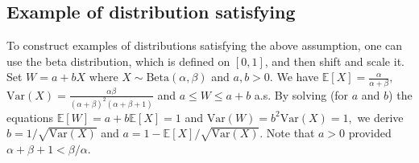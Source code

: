 \subsection{Example of distribution satisfying }
\label{sec:example_distribution}
To construct examples of distributions satisfying the above assumption, one can use the beta distribution, which is defined on \([0, 1]\), and then shift and scale it. Set \( W = a + bX \)  where \( X \sim \text{Beta}(\alpha, \beta) \) and \(a,b>0.\) We have \( \mathbb{E}[X] = \frac{\alpha}{\alpha + \beta}, \)  \( \text{Var}(X) = \frac{\alpha \beta}{(\alpha + \beta)^2 (\alpha + \beta + 1)} \) and \(a\leq W\leq a+b \) a.s.  By solving (for \( a \) and \( b \)) the equations \( \mathbb{E}[W] = a + b\mathbb{E}[X] = 1 \) and \( \text{Var}(W) = b^2\text{Var}(X) = 1, \) we derive \(b=1/\sqrt{\text{Var}(X)}\) and \(a=1-\mathbb{E}[X]/\sqrt{\text{Var}(X)}.\) Note that $a>0$ provided $\alpha+\beta+1<\beta/\alpha$.


